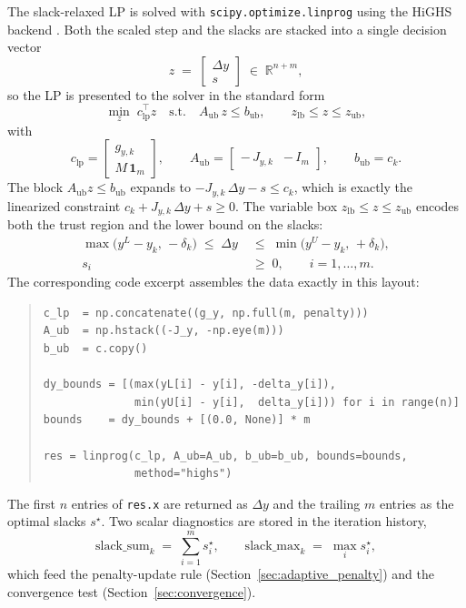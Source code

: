 The slack-relaxed LP is solved with \texttt{scipy.optimize.linprog}
using the HiGHS backend \citep{Huangfu2018HiGHS}. Both the scaled
step and the slacks are stacked into a single decision vector
\begin{equation}
    z \;=\; \begin{bmatrix} \Delta y \\ s \end{bmatrix}
    \;\in\; \mathbb{R}^{n+m},
\end{equation}
so the LP is presented to the solver in the standard form
\begin{equation}
    \min_{z} \; c_{\mathrm{lp}}^{\!\top} z
    \quad \text{s.t.} \quad
    A_{\mathrm{ub}}\, z \leq b_{\mathrm{ub}},
    \qquad z_{\mathrm{lb}} \leq z \leq z_{\mathrm{ub}},
\end{equation}
with
\begin{equation}
\label{eq:lp_data}
    c_{\mathrm{lp}} =
        \begin{bmatrix} g_{y,k} \\ M\,\mathbf{1}_m \end{bmatrix},
    \qquad
    A_{\mathrm{ub}} =
        \begin{bmatrix} -\,J_{y,k} & -\,I_m \end{bmatrix},
    \qquad
    b_{\mathrm{ub}} = c_k .
\end{equation}
The block $A_{\mathrm{ub}} z \leq b_{\mathrm{ub}}$ expands to
$-J_{y,k}\,\Delta y - s \leq c_k$, which is exactly the linearized
constraint $c_k + J_{y,k}\,\Delta y + s \geq 0$. The variable box
$z_{\mathrm{lb}} \leq z \leq z_{\mathrm{ub}}$ encodes both the trust
region and the lower bound on the slacks:
\begin{align}
    \max\!\bigl(y^L - y_k,\, -\delta_k\bigr) \;\leq\; \Delta y \;&\leq\;
    \min\!\bigl(y^U - y_k,\, +\delta_k\bigr), \\
    s_i \;&\geq\; 0,
    \qquad i = 1, \dots, m .
\end{align}
The corresponding code excerpt assembles the data exactly in this layout:
\begin{quote}
\begin{verbatim}
c_lp  = np.concatenate((g_y, np.full(m, penalty)))
A_ub  = np.hstack((-J_y, -np.eye(m)))
b_ub  = c.copy()

dy_bounds = [(max(yL[i] - y[i], -delta_y[i]),
              min(yU[i] - y[i],  delta_y[i])) for i in range(n)]
bounds    = dy_bounds + [(0.0, None)] * m

res = linprog(c_lp, A_ub=A_ub, b_ub=b_ub, bounds=bounds,
              method="highs")
\end{verbatim}
\end{quote}
The first $n$ entries of \texttt{res.x} are returned as $\Delta y$ and
the trailing $m$ entries as the optimal slacks $s^\star$. Two scalar
diagnostics are stored in the iteration history,
\begin{equation}
    \mathrm{slack\_sum}_k \;=\; \sum_{i=1}^{m} s_i^\star,
    \qquad
    \mathrm{slack\_max}_k \;=\; \max_{i} s_i^\star,
\end{equation}
which feed the penalty-update rule
(Section~\ref{sec:adaptive_penalty}) and the convergence test
(Section~\ref{sec:convergence}).

